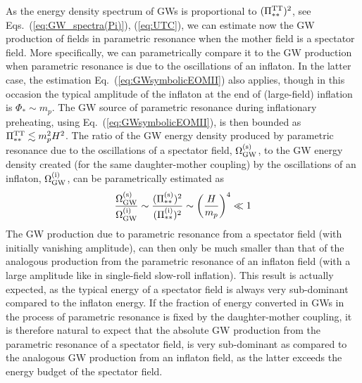 \documentclass[a4paper,11pt]{article}
\begin{document}
As the energy density spectrum of GWs is proportional to $(\Pi_{**}^{\rm TT})^2$, see Eqs.~(\ref{eq:GW_spectra(Pi)}), (\ref{eq:UTC}), we can estimate now the GW production of fields in parametric resonance when the mother field is a spectator field. More specifically, we can parametrically compare it to the GW production when parametric resonance is due to the oscillations of an inflaton. In the latter case, the estimation Eq.~(\ref{eq:GWsymbolicEOMII}) also applies, though in this occasion the typical amplitude of the inflaton at the end of (large-field) inflation is $\Phi_* \sim m_p$. The GW source of parametric resonance during inflationary preheating, using Eq.~(\ref{eq:GWsymbolicEOMII}), is then bounded as $\Pi_{**}^{\rm TT} \lesssim m_p^2H^2$. The ratio of the GW energy density produced by parametric resonance due to the oscillations of a spectator field, $\Omega_{\rm GW}^{\rm (s)}$, to the GW energy density created (for the same daughter-mother coupling) by the oscillations of an inflaton, $\Omega_{\rm GW}^{\rm (i)}$, can be parametrically estimated as
\begin{eqnarray}\label{eq:StoIcomparison}
{\Omega_{\rm GW}^{\rm (s)} \over \Omega_{\rm GW}^{\rm (i)}} \sim {(\Pi_{**}^{\rm (s)})^2\over(\Pi_{**}^{\rm (i)})^2} \sim \left({H\over m_p}\right)^4 \ll 1
\end{eqnarray}
The GW production due to parametric resonance from a spectator field (with initially vanishing amplitude), can then only be much smaller than that of the analogous production from the parametric resonance of an inflaton field (with a large amplitude like in single-field slow-roll inflation). This result is actually expected, as the typical energy of a spectator field is always very sub-dominant compared to the inflaton energy. If the fraction of energy converted in GWs in the process of parametric resonance is fixed by the daughter-mother coupling, it is therefore natural to expect that the absolute GW production from the parametric resonance of a spectator field, is very sub-dominant as compared to the analogous GW production from an inflaton field, as the latter exceeds the energy budget of the spectator field.
\end{document}

